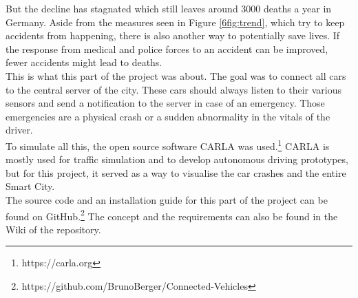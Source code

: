 \noindent
But the decline has stagnated which still leaves around 3000 deaths a year in Germany.
Aside from the measures seen in Figure \ref{6fig:trend}, 
which try to keep accidents from happening, 
there is also another way to potentially save lives.
If the response from medical and police forces to an accident can be improved,
fewer accidents might lead to deaths. 
\\
\newline
This is what this part of the project was about. 
The goal was to connect all cars to the central server of the city.
These cars should always listen to their various sensors
and send a notification to the server
in case of an emergency.
Those emergencies are a physical crash or 
a sudden abnormality in the vitals of the driver.
\\
\newline
To simulate all this, the open source software CARLA was used.\footnote
{https://carla.org} 
CARLA is mostly used for traffic simulation and to develop autonomous driving prototypes,
but for this project, 
it served as a way to visualise the car crashes and the entire Smart City.
\\
\newline
The source code and an installation guide for this part of the project
can be found on GitHub.\footnote
{https://github.com/BrunoBerger/Connected-Vehicles}
The concept and the requirements can also be found
in the Wiki of the repository.
